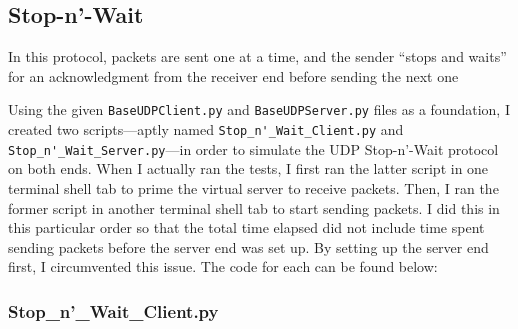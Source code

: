 \documentclass{article}
\begin{document}
\subsection{Stop-n'-Wait}

In this protocol, packets are sent one at a time, and the sender ``stops and waits'' for an acknowledgment from the receiver end before sending the next one

Using the given \verb|BaseUDPClient.py| and \verb|BaseUDPServer.py| files as a foundation, I created two scripts—aptly named \verb|Stop_n'_Wait_Client.py| and \verb|Stop_n'_Wait_Server.py|—in order to simulate the UDP Stop-n'-Wait protocol on both ends. When I actually ran the tests, I first ran the latter script in one terminal shell tab to prime the virtual server to receive packets. Then, I ran the former script in another terminal shell tab to start sending packets. I did this in this particular order so that the total time elapsed did not include time spent sending packets before the server end was set up. By setting up the server end first, I circumvented this issue. The code for each can be found below:

\subsubsection{Stop\_n'\_Wait\_Client.py}
\end{document}
